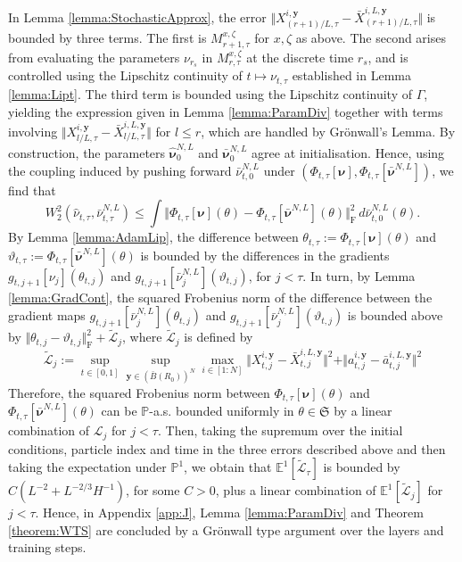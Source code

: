 \documentclass{article}
\newcommand{\E}{\mathbb{E}}
\begin{document}
 In Lemma \ref{lemma:StochasticApprox}, the error $\Vert X^{i,\bm{y}}_{(r+1)/L,\tau}-\bar X^{i,L,\bm{y}}_{(r+1)/L,\tau}\Vert$ is bounded by three terms. The first is $M^{x,\zeta}_{r+1,\tau}$ for $x,\zeta$ as above. The second arises from evaluating the parameters $\nu_{r_{s}}$ in $M^{x,\zeta}_{r,\tau}$ at the discrete time $r_s$, and is controlled using the Lipschitz continuity of $t\mapsto \nu_{t,\tau}$ established in Lemma \ref{lemma:Lipt}. The third term is bounded using the Lipschitz continuity of $\Gamma$, yielding the expression given in Lemma \ref{lemma:ParamDiv} together with terms involving $\Vert X^{i,\bm{y}}_{l/L,\tau}-\bar X^{i,L,\bm{y}}_{l/L,\tau}\Vert$ for $l\le r$, which are handled by Gr\"onwall's Lemma. By construction, the parameters $\bm{\hat \nu}_0^{N,L}$ and $\bm{\bar \nu}_0^{N,L}$ agree at initialisation. Hence, using the coupling induced by pushing forward $\bar \nu^{N,L}_{t,0}$ under $(\Phi_{t,\tau}[\bm \nu],\Phi_{t,\tau}[\bm{\bar {\nu}}^{N,L}])$, we find that
 \[
  W_2^2(\hat\nu_{t,\tau},\bar \nu^{N,L}_{t,\tau}) \le \int \Vert \Phi_{t,\tau}[\bm \nu](\theta)- \Phi_{t,\tau}[\bm{\bar\nu}^{N,L}](\theta)\Vert_\mathrm{F}^2\,d\bar\nu^{N,L}_{t,0}(\theta).
 \]
 By Lemma \ref{lemma:AdamLip}, the difference between $\theta_{t,\tau}:=\Phi_{t,\tau}[\bm\nu](\theta)$ and $\vartheta_{t,\tau}:=\Phi_{t,\tau}[\bm{\bar{\nu}}^{N,L}](\theta)$ is bounded by the differences in the gradients $g_{t,j+1}[\nu_j](\theta_{t,j})$ and $g_{t,j+1}[\bar\nu^{N,L}_j](\vartheta_{t,j})$, for $j<\tau$. In turn, by Lemma \ref{lemma:GradCont}, the squared Frobenius norm of the difference between the gradient maps $g_{t,j+1}[\bar\nu^{N,L}_j](\theta_{t,j})$ and $g_{t,j+1}[\bar\nu^{N,L}_j](\vartheta_{t,j})$ is bounded above by $\Vert \theta_{t,j}-\vartheta_{t,j}\Vert^2_\mathrm{F}+ \widetilde{\mathscr{L}}_j$, where $\widetilde{\mathscr{L}}_j$ is defined by
 \[
 \widetilde{\mathscr{L}}_j :=\sup_{t\in[0,1]}\sup_{\bm{y}\in (\bar B(R_0))^N}\max_{i\in[1:N]}\Vert X^{i,\bm{y}}_{t,j}-\bar X^{i,L,\bm{y}}_{t,j}\Vert^2+\Vert a^{i,\bm{y}}_{t,j}-\bar a^{i,L,\bm{y}}_{t,j}\Vert^2
 \]
 Therefore, the squared Frobenius norm between $\Phi_{t,\tau}[\bm\nu](\theta)$ and $\Phi_{t,\tau}[\bm{\bar\nu}^{N,L}](\theta)$ can be $\mathbb P$-a.s. bounded uniformly in $\theta\in \mathfrak{S}$ by a linear combination of $\mathscr{L}_j$ for $j<\tau$. Then, taking the supremum over the initial conditions, particle index and time in the three errors described above and then taking the expectation under $\mathbb P^1$, we obtain that $\E^1[\widetilde{\mathscr{L}}_\tau]$ is bounded by $C(L^{-2}+ L^{-2/3}H^{-1})$, for some $C>0$, plus a linear combination of $\E^1[\widetilde{\mathscr{L}}_j]$ for $j<\tau$. Hence, in Appendix \ref{app:J},  Lemma \ref{lemma:ParamDiv} and Theorem \ref{theorem:WTS} are concluded by a Gr\"onwall type argument over the layers and training steps.
\end{document}

